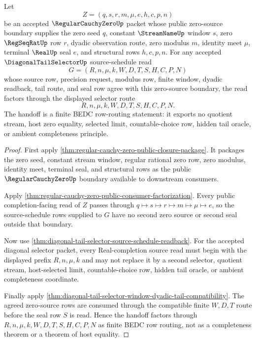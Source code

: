 \begin{theorem}
\label{thm:regular-cauchy-zero-diagonal-selector-handoff}
Let
$$
Z=(q,s,r,m,\mu,e,h,c,p,n)
$$
be an accepted $\RegularCauchyZeroUp$ packet whose public zero-source boundary
supplies the zero seed $q$, constant $\StreamNameUp$ window $s$, zero
$\RegSeqRatUp$ row $r$, dyadic observation route, zero modulus $m$, identity
meet $\mu$, terminal $\RealUp$ seal $e$, and structural rows $h,c,p,n$. For
any accepted $\DiagonalTailSelectorUp$ source-schedule read
$$
G=(R,n,\mu,k,W,D,T,S,H,C,P,N)
$$
whose source row, precision request, modulus row, finite window, dyadic
readback, tail route, and seal row agree with this zero-source boundary, the
read factors through the displayed selector route
$$
R,n,\mu,k,W,D,T,S,H,C,P,N.
$$
The handoff is a finite BEDC row-routing statement: it exports no quotient
stream, host zero equality, selected limit, countable-choice row, hidden tail
oracle, or ambient completeness principle.
\end{theorem}
\begin{proof}
First apply \autoref{thm:regular-cauchy-zero-public-closure-package}. It
packages the zero seed, constant stream window, regular rational zero row,
zero modulus, identity meet, terminal seal, and structural rows as the public
$\RegularCauchyZeroUp$ boundary available to downstream consumers.

Apply \autoref{thm:regular-cauchy-zero-public-consumer-factorization}. Every
public completion-facing read of $Z$ passes through
$q \mapsto s \mapsto r \mapsto m \mapsto \mu \mapsto e$, so the
source-schedule rows supplied to $G$ have no second zero source or second seal
outside that boundary.

Now use \autoref{thm:diagonal-tail-selector-source-schedule-readback}. For
the accepted diagonal selector packet, every Real-completion source read must
begin with the displayed prefix $R,n,\mu,k$ and may not replace it by a second
selector, quotient stream, host-selected limit, countable-choice row, hidden
tail oracle, or ambient completeness coordinate.

Finally apply
\autoref{thm:diagonal-tail-selector-window-dyadic-tail-compatibility}. The
agreed zero-source rows are consumed through the compatible finite
$W,D,T$ route before the seal row $S$ is read. Hence the handoff factors
through $R,n,\mu,k,W,D,T,S,H,C,P,N$ as finite BEDC row routing, not as a
completeness theorem or a theorem of host equality.
\end{proof}

